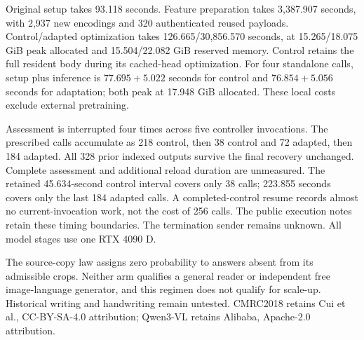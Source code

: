 \documentclass[10pt,a4paper]{article}
\begin{document}
Original setup takes 93.118 seconds. Feature preparation takes 3,387.907
seconds, with 2,937 new encodings and 320 authenticated reused payloads.
Control/adapted optimization takes 126.665/30,856.570 seconds, at
15.265/18.075 GiB peak allocated and 15.504/22.082 GiB reserved memory.
Control retains the full resident body during its cached-head optimization.
For four standalone calls, setup plus inference is $77.695+5.022$ seconds
for control and $76.854+5.056$ seconds for adaptation; both peak at 17.948
GiB allocated. These local costs exclude external pretraining.

Assessment is interrupted four times across five controller invocations.
The prescribed calls accumulate as 218 control, then 38 control and 72
adapted, then 184 adapted. All 328 prior indexed outputs survive the final
recovery unchanged. Complete assessment and additional reload duration are
unmeasured. The retained 45.634-second control interval covers only 38 calls;
223.855 seconds covers only the last 184 adapted calls. A completed-control
resume records almost no current-invocation work, not the cost of 256 calls.
The public execution notes retain these timing boundaries. The termination
sender remains unknown. All model stages use one RTX 4090 D.

The source-copy law assigns zero probability to answers absent from its
admissible crops. Neither arm qualifies a general reader or independent free
image-language generator, and this regimen does not qualify for scale-up.
Historical writing and handwriting remain untested. CMRC2018 retains
Cui et al.\cite{cmrc}, CC-BY-SA-4.0 attribution; Qwen3-VL retains Alibaba,
Apache-2.0 attribution.

\clearpage
{}
\end{document}
